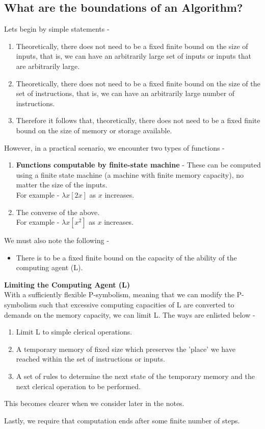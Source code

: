 \documentclass[openany]{book}
\begin{document}
\subsection{What are the boundations of an Algorithm?}
Lets begin by simple statements - 
\begin{enumerate}
    \item Theoretically, there does not need to be a fixed finite bound on the size of inputs, that is, we can have an arbitrarily large set of inputs or inputs that are arbitrarily large. 
    \item Theoretically, there does not need to be a fixed finite bound on the size of the set of instructions, that is, we can have an arbitrarily large number of instructions. 
    \item Therefore it follows that, theoretically, there does not need to be a fixed finite bound on the size of memory or storage available. 
\end{enumerate}
However, in a practical scenario, we encounter two types of functions - 
\begin{enumerate}
    \item \textbf{Functions computable by finite-state machine} - These can be computed using a finite state machine (a machine with finite memory capacity), no matter the size of the inputs. \\
    For example - $\lambda x[2x]$ as $x$ increases.
    \item The converse of the above. \\
    For example - $\lambda x[x^2]$ as $x$ increases. 
\end{enumerate}
We must also note the following - 
\begin{itemize}
    \item There is to be a fixed finite bound on the capacity of the ability of the computing agent (L). 
\end{itemize}
\begin{mynote}
\textbf{Limiting the Computing Agent (L)} \\
With a sufficiently flexible P-symbolism, meaning that we can modify the P-symbolism such that excessive computing capacities of L are converted to demands on the memory capacity, we can limit L. The ways are enlisted below - 
\begin{enumerate}
    \item Limit L to simple clerical operations. 
    \item A temporary memory of fixed size which preserves the 'place' we have reached within the set of instructions or inputs. 
    \item A set of rules to determine the next state of the temporary memory and the next clerical operation to be performed. 
\end{enumerate}
This becomes clearer when we consider  later in the notes. 
\end{mynote}
Lastly, we require that computation ends after some finite number of steps. 
\end{document}
